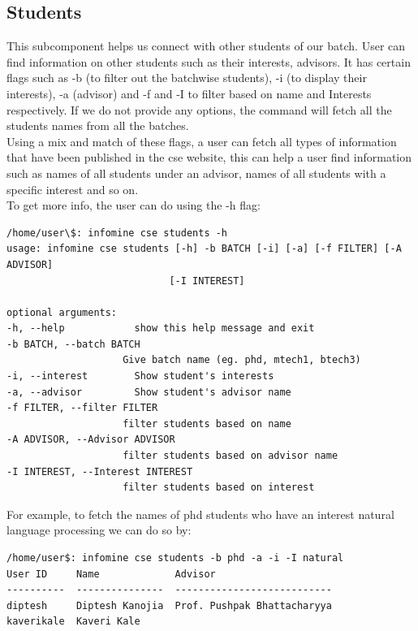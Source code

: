 \documentclass[12pt, letterpaper, twoside]{article}
\begin{document}
\subsection{Students}
This subcomponent helps us connect with other students of our batch. 
User can find information on other students such as their interests, advisors.
It has certain flags such as -b (to filter out the batchwise students), -i (to display their interests), -a (advisor)
and -f and -I to filter based on name and Interests respectively.
If we do not provide any options, the command will fetch all the students names from all the batches.\\
Using a mix and match of these flags, a user can fetch all types of information
that have been published in the cse website, this can help a user find information such as names of all students
under an advisor, names of all students with a specific interest and so on.\\
To get more info, the user can do using the -h flag:
\begin{verbatim}
/home/user\$: infomine cse students -h
usage: infomine cse students [-h] -b BATCH [-i] [-a] [-f FILTER] [-A ADVISOR]
                            [-I INTEREST]

optional arguments:
-h, --help            show this help message and exit
-b BATCH, --batch BATCH
                    Give batch name (eg. phd, mtech1, btech3)
-i, --interest        Show student's interests
-a, --advisor         Show student's advisor name
-f FILTER, --filter FILTER
                    filter students based on name
-A ADVISOR, --Advisor ADVISOR
                    filter students based on advisor name
-I INTEREST, --Interest INTEREST
                    filter students based on interest
\end{verbatim}
For example, to fetch the names of phd students who have an interest natural language processing
we can do so by:\\
\begin{verbatim}
/home/user$: infomine cse students -b phd -a -i -I natural
User ID     Name             Advisor                      
----------  ---------------  ---------------------------  
diptesh     Diptesh Kanojia  Prof. Pushpak Bhattacharyya  
kaverikale  Kaveri Kale                                   
\end{verbatim}
\end{document}
